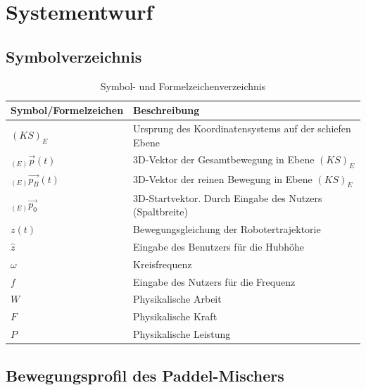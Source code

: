 \chapter{Systementwurf}

\section{Symbolverzeichnis}


\begin{table}[htbp]
    \centering
    \begin{tabular}{l l}
        \hline
        \textbf{Symbol/Formelzeichen} & \textbf{Beschreibung} \\
        \hline
        \((KS)_E\) & Ursprung des Koordinatensystems auf der schiefen Ebene \\
        \( _{(E)}\vec{p}(t) \) & 3D-Vektor der Gesamtbewegung in Ebene \((KS)_E\)\\
        \(_{(E)}\vec{p_B} (t) \) & 3D-Vektor der reinen Bewegung in Ebene \((KS)_E\) \\
        \(_{(E)}\vec{p_0}\) & 3D-Startvektor. Durch Eingabe des Nutzers (Spaltbreite)\\
        \(z(t)\) & Bewegungsgleichung der Robotertrajektorie \\
        \(\hat{z}\) & Eingabe des Benutzers für die Hubhöhe\\
        \(\omega\) & Kreisfrequenz \\
        \(f\) & Eingabe des Nutzers für die Frequenz \\
        \(W\) & Physikalische Arbeit \\
        \(F\) & Physikalische Kraft \\
        \(P\) & Physikalische Leistung \\
        

        \hline
    \end{tabular}
    \caption{Symbol- und Formelzeichenverzeichnis}
\end{table}

\section{Bewegungsprofil des Paddel-Mischers}

